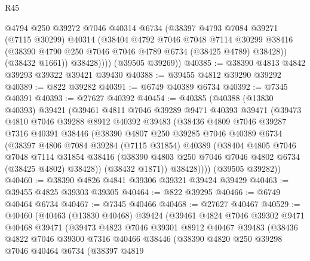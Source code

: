 \begin{lexlean}{R45}
\begin{coremodule}
{              @4794
              @250
              @39272
              @7046
              @40314
              @6734
              (@38397
                @4793
                @7084
                @39271
                (@7115 @30299)
                @40314
                (@38404
                  @4792
                  @7046
                  @7048
                  @7114
                  @30299
                  @38416
                  (@38390 @4790 @250 @7046 @7046 @4789 @6734 (@38425 @4789) @38428))
                (@38432 @1661))
              @38428))))
      (@39505 @39269))
@40385 := @38390 @4813 @4842 @39293 @39322 @39421 @39430
@40388 := @39455 @4812 @39290 @39292
@40389 := @822 @39282
@40391 := @6749 @40389 @6734
@40392 := @7345 @40391
@40393 := @27627 @40392
@40454 := @40385
    (@40388
      (@13830 @40393)
      @39421
      (@39461
        @4811
        @7046
        @39289
        @9471
        @40393
        @39471
        (@39473
          @4810
          @7046
          @39288
          @8912
          @40392
          @39483
          (@38436
            @4809
            @7046
            @39287
            @7316
            @40391
            @38446
            (@38390
              @4807
              @250
              @39285
              @7046
              @40389
              @6734
              (@38397
                @4806
                @7084
                @39284
                (@7115 @31854)
                @40389
                (@38404
                  @4805
                  @7046
                  @7048
                  @7114
                  @31854
                  @38416
                  (@38390 @4803 @250 @7046 @7046 @4802 @6734 (@38425 @4802) @38428))
                (@38432 @1871))
              @38428))))
      (@39505 @39282))
@40460 := @38390 @4826 @4841 @39306 @39321 @39424 @39429
@40463 := @39455 @4825 @39303 @39305
@40464 := @822 @39295
@40466 := @6749 @40464 @6734
@40467 := @7345 @40466
@40468 := @27627 @40467
@40529 := @40460
    (@40463
      (@13830 @40468)
      @39424
      (@39461
        @4824
        @7046
        @39302
        @9471
        @40468
        @39471
        (@39473
          @4823
          @7046
          @39301
          @8912
          @40467
          @39483
          (@38436
            @4822
            @7046
            @39300
            @7316
            @40466
            @38446
            (@38390
              @4820
              @250
              @39298
              @7046
              @40464
              @6734
              (@38397
                @4819
}
\end{coremodule}
\end{lexlean}
